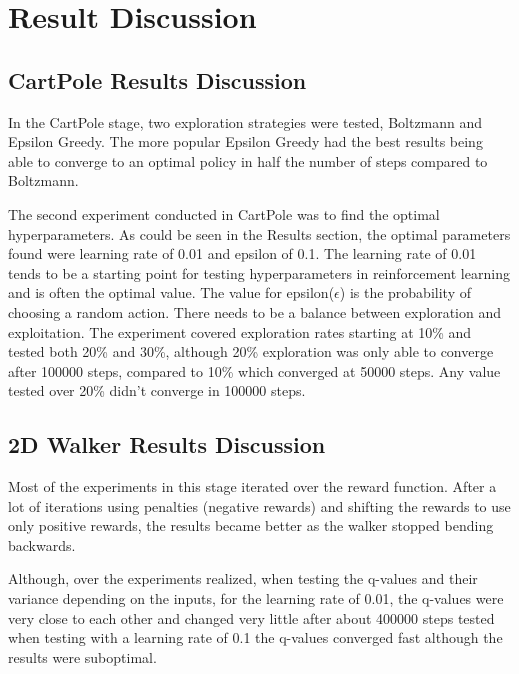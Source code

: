 \chapter{Result Discussion}

\section{CartPole Results Discussion}
In the CartPole stage, two exploration strategies were tested, Boltzmann and Epsilon Greedy. The more popular Epsilon Greedy had the best results being able to converge to an optimal policy in half the number of steps compared to Boltzmann.

The second experiment conducted in CartPole was to find the optimal hyperparameters. As could be seen in the Results section, the optimal parameters found were learning rate of 0.01 and epsilon of 0.1. The learning rate of 0.01 tends to be a starting point for testing hyperparameters in reinforcement learning and is often the optimal value. 
The value for epsilon($\epsilon$) is the probability of choosing a random action. There needs to be a balance between exploration and exploitation. The experiment covered exploration rates starting at 10\% and tested both 20\% and 30\%, although 20\% exploration was only able to converge after 100000 steps, compared to 10\% which converged at 50000 steps. Any value tested over 20\% didn't converge in 100000 steps.

\section{2D Walker Results Discussion}

 Most of the experiments in this stage iterated over the reward function. After a lot of iterations using penalties (negative rewards) and shifting the rewards to use only positive rewards, the results became better as the walker stopped bending backwards.

 Although, over the experiments realized, when testing the q-values and their variance depending on the inputs, for the learning rate of 0.01, the q-values were very close to each other and changed very little after about 400000 steps tested when testing with a learning rate of 0.1 the q-values converged fast although the results were suboptimal.
 